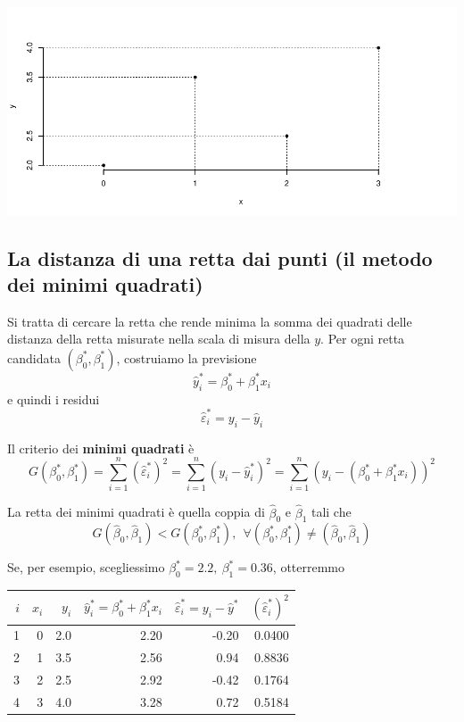 \documentclass[
  11pt,
]{book}
\theoremstyle{mytheoremstyle}
\theoremstyle{mydefstyle}
\begin{document}
\begin{center}\includegraphics{Appunti_di_Statistica_2025_files/figure-latex/17-regressione-I-30-1} \end{center}

\subsection{La distanza di una retta dai punti (il metodo dei minimi quadrati)}\label{la-distanza-di-una-retta-dai-punti-il-metodo-dei-minimi-quadrati}

Si tratta di cercare la retta che rende minima la somma dei quadrati delle distanza
della retta misurate nella scala di misura della \(y\).
Per ogni retta candidata \((\beta_0^*,\beta_1^*)\), costruiamo la previsione
\[\hat y_i^*=\beta_0^*+\beta_1^*x_i\]
e quindi i residui
\[\hat\varepsilon_i^*=y_i-\hat y_i\]

Il criterio dei \textbf{minimi quadrati} è
\[G(\beta_0^*,\beta_1^*)=\sum_{i=1}^n ({\hat\varepsilon_i^*})^{2} =\sum_{i=1}^n(y_i-\hat y_i^*)^2=\sum_{i=1}^n(y_i-(\beta_0^*+\beta_1^*x_i))^2\]

La retta dei minimi quadrati è quella coppia di \(\hat\beta_0\) e \(\hat\beta_1\) tali che
\[G(\hat\beta_0,\hat\beta_1)<G(\beta_0^*,\beta_1^*),~~\forall(\beta_0^*,\beta_1^*)\neq(\hat\beta_0,\hat\beta_1)\]

Se, per esempio, scegliessimo \(\beta_0^*=2.2,~\beta_1^*=0.36\), otterremmo

\begin{tabular}{rrrrrr}
\toprule
$i$ & $x_i$ & $y_i$ & $\hat y_i^*=\beta_0^*+\beta_1^*x_i$ & $\hat\varepsilon_i^*=y_i-\hat y^*$ & $({\hat\varepsilon_i^*})^2$\\
\midrule
1 & 0 & 2.0 & 2.20 & -0.20 & 0.0400\\
2 & 1 & 3.5 & 2.56 & 0.94 & 0.8836\\
3 & 2 & 2.5 & 2.92 & -0.42 & 0.1764\\
4 & 3 & 4.0 & 3.28 & 0.72 & 0.5184\\
\bottomrule
\end{tabular}
\end{document}
